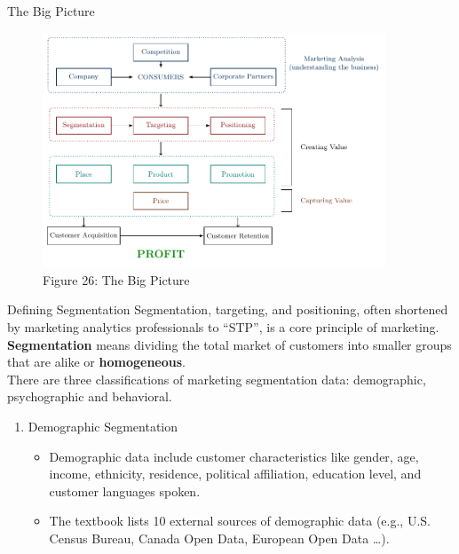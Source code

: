 \documentclass[pdf]{beamer}
\newcommand{\empr}[1]{{\color{franklinblue}\textbf{#1}}}
\theoremstyle{remark}
\theoremstyle{definition}
\begin{document}
\begin{frame}[t]{The Big Picture}
\begin{figure}[htbp]
  \captionsetup{justification=centering}
  \includegraphics[height=7cm, trim=0.0cm 0.0cm 0.0cm 0.0cm width=7cm]{Big_Picture.pdf}
  \caption{Figure {\color{franklinblue} 26}: The Big Picture}
\end{figure}

\end{frame}

\begin{frame}[t]{Defining Segmentation}
Segmentation, targeting, and positioning, often shortened by marketing analytics professionals to ``STP'', is a core principle of marketing. \empr{Segmentation} means dividing the total market of customers into smaller groups that are alike or \empr{homogeneous}. \\
\vspace{1.5ex}
There are three classifications of marketing segmentation data: demographic, psychographic and behavioral.\\
\vspace{1.5ex}
\begin{enumerate}
\item Demographic Segmentation
\small
\begin{itemize}
 \item Demographic data include customer characteristics like gender, age, income, ethnicity, residence, political affiliation, education level, and customer languages spoken.
 \item The textbook lists 10 external sources of demographic data (e.g., U.S. Census Bureau, Canada Open Data, European Open Data \ldots).
\end{itemize}
\end{enumerate}
\end{frame}
\end{document}
